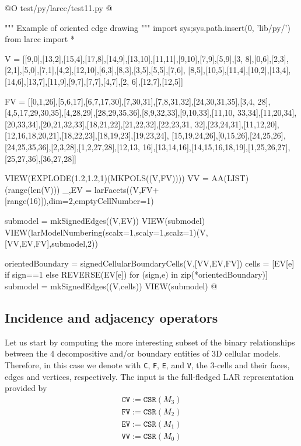 \documentclass[11pt,oneside]{article}	%
\begin{document}
@O test/py/larcc/test11.py
@{""" Example of oriented edge drawing """
import sys;sys.path.insert(0, 'lib/py/')
from larcc import *

V = [[9,0],[13,2],[15,4],[17,8],[14,9],[13,10],[11,11],[9,10],[7,9],[5,9],[3,
8],[0,6],[2,3],[2,1],[5,0],[7,1],[4,2],[12,10],[6,3],[8,3],[3,5],[5,5],[7,6],
[8,5],[10,5],[11,4],[10,2],[13,4],[14,6],[13,7],[11,9],[9,7],[7,7],[4,7],[2,
6],[12,7],[12,5]]

FV = [[0,1,26],[5,6,17],[6,7,17,30],[7,30,31],[7,8,31,32],[24,30,31,35],[3,4,
28],[4,5,17,29,30,35],[4,28,29],[28,29,35,36],[8,9,32,33],[9,10,33],[11,10,
33,34],[11,20,34],[20,33,34],[20,21,32,33],[18,21,22],[21,22,32],[22,23,31,
32],[23,24,31],[11,12,20],[12,16,18,20,21],[18,22,23],[18,19,23],[19,23,24],
[15,19,24,26],[0,15,26],[24,25,26],[24,25,35,36],[2,3,28],[1,2,27,28],[12,13,
16],[13,14,16],[14,15,16,18,19],[1,25,26,27],[25,27,36],[36,27,28]]

VIEW(EXPLODE(1.2,1.2,1)(MKPOLS((V,FV))))
VV = AA(LIST)(range(len(V)))
_,EV = larFacets((V,FV+[range(16)]),dim=2,emptyCellNumber=1)

submodel = mkSignedEdges((V,EV))
VIEW(submodel)
VIEW(larModelNumbering(scalx=1,scaly=1,scalz=1)(V,[VV,EV,FV],submodel,2))

orientedBoundary = signedCellularBoundaryCells(V,[VV,EV,FV])
cells = [EV[e] if sign==1 else REVERSE(EV[e]) for (sign,e) in zip(*orientedBoundary)]
submodel = mkSignedEdges((V,cells))
VIEW(submodel)
@}


\subsection{Incidence and adjacency operators}

Let us start by computing the more interesting subset of the binary relationships between the 4 decompositive and/or boundary entities of 3D cellular models.  Therefore, in this case we denote with \texttt{C}, \texttt{F}, \texttt{E}, and \texttt{V}, the 3-cells and their faces, edges and vertices, respectively.
The input is the full-fledged LAR representation provided by 
\begin{align}
\texttt{CV} := \texttt{CSR}(M_3) \\
\texttt{FV} := \texttt{CSR}(M_2) \\
\texttt{EV} := \texttt{CSR}(M_1) \\
\texttt{VV} := \texttt{CSR}(M_0) 
\end{align}
\end{document}
